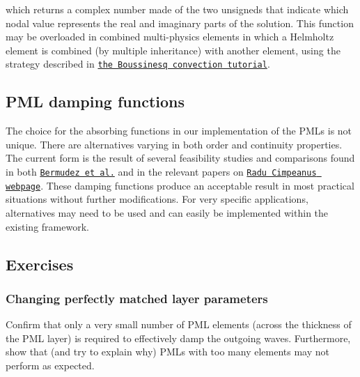  which returns a complex number made of the two unsigneds that indicate which nodal value represents the real and imaginary parts of the solution. This function may be overloaded in combined multi-\/physics elements in which a Helmholtz element is combined (by multiple inheritance) with another element, using the strategy described in \href{../../../multi_physics/b_convection/html/index.html}{\tt the Boussinesq convection tutorial}.\hypertarget{index_dampingfct}{}\subsection{P\+M\+L damping functions}\label{index_dampingfct}
The choice for the absorbing functions in our implementation of the P\+M\+Ls is not unique. There are alternatives varying in both order and continuity properties. The current form is the result of several feasibility studies and comparisons found in both \href{http://www.sciencedirect.com/science/article/pii/S0021999106004487}{\tt Bermudez et al.} and in the relevant papers on \href{http://imperial.academia.edu/RaduCimpeanu/Papers}{\tt Radu Cimpeanu\textquotesingle{}s webpage}. These damping functions produce an acceptable result in most practical situations without further modifications. For very specific applications, alternatives may need to be used and can easily be implemented within the existing framework.\hypertarget{index_ex}{}\subsection{Exercises}\label{index_ex}
\hypertarget{index_pmlsize}{}\subsubsection{Changing perfectly matched layer parameters}\label{index_pmlsize}
Confirm that only a very small number of P\+ML elements (across the thickness of the P\+ML layer) is required to effectively damp the outgoing waves. Furthermore, show that (and try to explain why) P\+M\+Ls with too many elements may not perform as expected.

